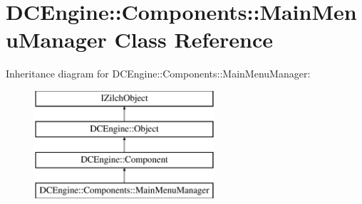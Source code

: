 \hypertarget{classDCEngine_1_1Components_1_1MainMenuManager}{\section{D\-C\-Engine\-:\-:Components\-:\-:Main\-Menu\-Manager Class Reference}
\label{classDCEngine_1_1Components_1_1MainMenuManager}
}
Inheritance diagram for D\-C\-Engine\-:\-:Components\-:\-:Main\-Menu\-Manager\-:\begin{figure}[H]
\begin{center}
\leavevmode
\includegraphics[height=4.000000cm]{classDCEngine_1_1Components_1_1MainMenuManager}
\end{center}
\end{figure}
